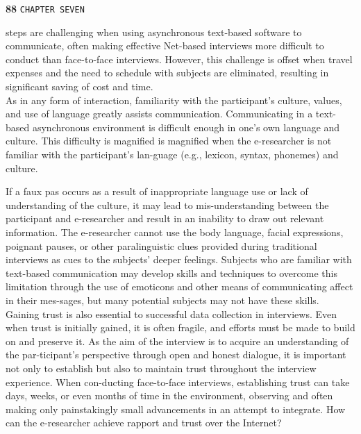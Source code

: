 \documentclass[,a49pt]{book}
\begin{document}
\begin{flushleft}
\textbf{88}\hspace*{1cm} \texttt{CHAPTER SEVEN}
\end{flushleft}

\vspace*{0.5cm}
steps are challenging when using asynchronous text-based software to communicate, often making effective Net-based interviews more difficult to conduct than face-to-face interviews. However, this challenge is offset when travel expenses and the need to schedule with subjects are eliminated, resulting in significant saving of cost and time.\\
\hspace*{0.5cm} As in any form of interaction, familiarity with the participant's culture, values, and use of language greatly assists communication. Communicating in a text-based asynchronous environment is difficult enough in one's own language and culture. This difficulty is magnified is magnified when the e-researcher is not familiar with the participant's lan-guage (e.g., lexicon, syntax, phonemes) and culture.

If a faux pas occurs as a result of inappropriate language use or lack of understanding of the culture, it may lead to mis-understanding between the participant and e-researcher and result in an inability to draw out relevant information. The e-researcher cannot use the body language, facial expressions, poignant pauses, or other paralinguistic clues provided during traditional interviews as cues to the subjects' deeper feelings. Subjects who are familiar with text-based communication may develop skills and techniques to overcome this limitation through the use of emoticons and other means of communicating affect in their mes-sages, but many potential subjects may not have these skills.\\

\hspace*{0.5cm} Gaining trust is also essential to successful data collection in interviews. Even when trust is initially gained, it is often fragile, and efforts must be made to build on and preserve it. As the aim of the interview is to acquire an understanding of the par-ticipant's perspective through open and honest dialogue, it is important not only to establish but also to maintain trust throughout the interview experience. When con-ducting face-to-face interviews, establishing trust can take days, weeks, or even months of time in the environment, observing and often making only painstakingly small advancements in an attempt to integrate. How can the e-researcher achieve rapport and trust over the Internet?\\
\end{document}

